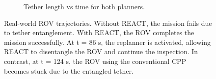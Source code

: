 \begin{figure}[t]
\begin{subfigure}[b]{0.48\linewidth}
        \caption{Tether length vs time for both planners.}
        \label{fig:traj_react}
    \end{subfigure}
    \caption{Real-world ROV trajectories. Without \ac{REACT}, the mission fails due to tether entanglement. With \ac{REACT}, the ROV completes the mission successfully. At t = 86 s, the replanner is activated, allowing \ac{REACT} to disentangle the \ac{ROV} and continue the inspection. In contrast, at t = 124 s, the \ac{ROV} using the conventional \ac{CPP} becomes stuck due to the entangled tether.}
    \label{fig:realworld_trajectory}
\end{figure}